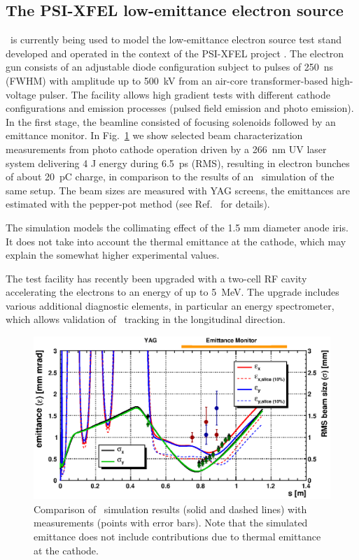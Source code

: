 \documentclass[acus]{JAC2003}
\begin{document}
\subsection{The PSI-XFEL low-emittance electron source}
\opal\ is currently being used to model the low-emittance electron source test stand 
developed and operated in the context of the PSI-XFEL project \cite{obla}.  
The electron gun consists of an adjustable diode configuration subject to pulses of 250~ns (FWHM) 
with amplitude up to 500~kV from an air-core transformer-based high-voltage pulser. 
The facility allows high gradient tests with different cathode configurations and emission processes 
(pulsed field emission and photo emission). 
In the first stage, the beamline consisted of focusing solenoids followed by an emittance 
monitor. 
In Fig.~\ref{fig:comp} we show selected beam characterization measurements from photo cathode operation 
driven by a 266~nm UV laser system delivering 4 \textmu J energy during 6.5~ps (RMS), resulting in 
electron bunches of about 20~pC charge, in comparison to the results of an \opal\ simulation of the same
setup.
The beam sizes are measured with YAG screens, the emittances are estimated with the pepper-pot method
(see Ref.~\cite{obla} for details).

The simulation models the collimating effect of the 1.5 mm diameter anode iris. 
It does not take into account the thermal emittance at the cathode, which may explain the somewhat higher
experimental values.  

The test facility has recently been upgraded with a two-cell RF cavity accelerating the electrons
to an energy of up to 5~MeV.
The upgrade includes various additional diagnostic elements, in particular an energy spectrometer, 
which allows validation of \opal\ tracking in the longitudinal direction.

\begin{figure}[htb]
\begin{center}
\includegraphics[angle=0,width=.99\linewidth]{./OBLA-Jul22.ps}
\end{center}
\vspace{-9mm}
\caption{Comparison of \opal\ simulation results (solid and dashed lines) with measurements (points with
error bars). Note that the simulated emittance does not include contributions due to thermal emittance at
the cathode.}
\label{fig:comp}
\end{figure}
\end{document}

